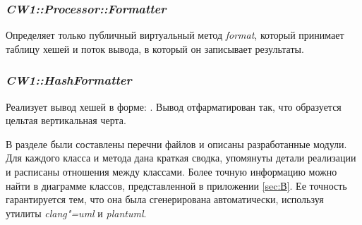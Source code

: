 \subsubsection*{\textit{CW1::Processor::Formatter}}

Определяет только публичный виртуальный метод \textit{format}, который принимает
таблицу хешей и поток вывода, в который он записывает результаты.

\subsubsection*{\textit{CW1::HashFormatter}}

Реализует вывод хешей в форме: . Вывод
отфарматирован так, что образуется цельтая вертикальная черта.

\vspace{\baselineskip}

В разделе были составлены перечни файлов и описаны разработанные модули. Для
каждого класса и метода дана краткая сводка, упомянуты детали реализации и
расписаны отношения между классами. Более точную информацию можно найти в
диаграмме классов, представленной в приложении \ref{sec:В}. Ее точность
гарантируется тем, что она была сгенерирована автоматически, используя утилиты
\textit{clang"=uml} и \textit{plantuml}.
